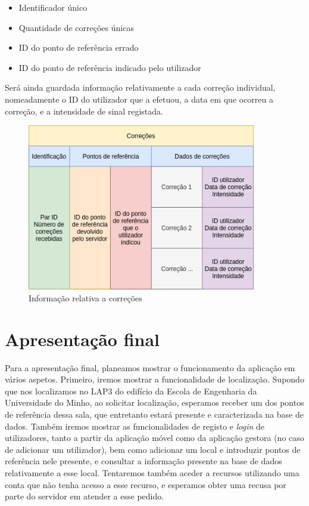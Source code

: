 \documentclass[12pt]{article} %
\begin{document}
\begin{itemize}[noitemsep]
\item Identificador único
\item Quantidade de correções únicas
\item ID do ponto de referência errado
\item ID do ponto de referência indicado pelo utilizador
\end{itemize}

Será ainda guardada informação relativamente a cada correção individual, nomeadamente o ID do utilizador que a efetuou, a data em que ocorreu a correção, e a intensidade de sinal registada.

\begin{figure}[!htbp]
  \centering
    \includegraphics[width=10cm]{modelodadoscorrecoes.png}
  \caption{Informação relativa a correções}
\end{figure}

\pagebreak

\section{Apresentação final}
Para a apresentação final, planeamos mostrar o funcionamento da aplicação em vários aspetos. Primeiro, iremos mostrar a funcionalidade de localização. Supondo que nos localizamos no LAP3 do edifício da Escola de Engenharia da Universidade do Minho, ao solicitar localização, esperamos receber um dos pontos de referência dessa sala, que entretanto estará presente e caracterizada na base de dados. Também iremos mostrar as funcionalidades de registo e \textit{login} de utilizadores, tanto a partir da aplicação móvel como da aplicação gestora (no caso de adicionar um utilizador), bem como adicionar um local e introduzir pontos de referência nele presente, e consultar a informação presente na base de dados relativamente a esse local. Tentaremos também aceder a recursos utilizando uma conta que não tenha acesso a esse recurso, e esperamos obter uma recusa por parte do servidor em atender a esse pedido.\par 
\pagebreak
\end{document}
